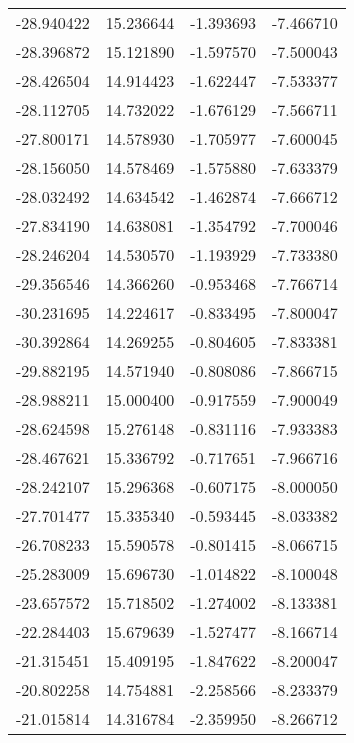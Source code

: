 \begin{tabular}{rrrr}
      -28.940422 &        15.236644 &   -1.393693 &  -7.466710 \\
      -28.396872 &        15.121890 &   -1.597570 &  -7.500043 \\
      -28.426504 &        14.914423 &   -1.622447 &  -7.533377 \\
      -28.112705 &        14.732022 &   -1.676129 &  -7.566711 \\
      -27.800171 &        14.578930 &   -1.705977 &  -7.600045 \\
      -28.156050 &        14.578469 &   -1.575880 &  -7.633379 \\
      -28.032492 &        14.634542 &   -1.462874 &  -7.666712 \\
      -27.834190 &        14.638081 &   -1.354792 &  -7.700046 \\
      -28.246204 &        14.530570 &   -1.193929 &  -7.733380 \\
      -29.356546 &        14.366260 &   -0.953468 &  -7.766714 \\
      -30.231695 &        14.224617 &   -0.833495 &  -7.800047 \\
      -30.392864 &        14.269255 &   -0.804605 &  -7.833381 \\
      -29.882195 &        14.571940 &   -0.808086 &  -7.866715 \\
      -28.988211 &        15.000400 &   -0.917559 &  -7.900049 \\
      -28.624598 &        15.276148 &   -0.831116 &  -7.933383 \\
      -28.467621 &        15.336792 &   -0.717651 &  -7.966716 \\
      -28.242107 &        15.296368 &   -0.607175 &  -8.000050 \\
      -27.701477 &        15.335340 &   -0.593445 &  -8.033382 \\
      -26.708233 &        15.590578 &   -0.801415 &  -8.066715 \\
      -25.283009 &        15.696730 &   -1.014822 &  -8.100048 \\
      -23.657572 &        15.718502 &   -1.274002 &  -8.133381 \\
      -22.284403 &        15.679639 &   -1.527477 &  -8.166714 \\
      -21.315451 &        15.409195 &   -1.847622 &  -8.200047 \\
      -20.802258 &        14.754881 &   -2.258566 &  -8.233379 \\
      -21.015814 &        14.316784 &   -2.359950 &  -8.266712 \\

\end{tabular}
